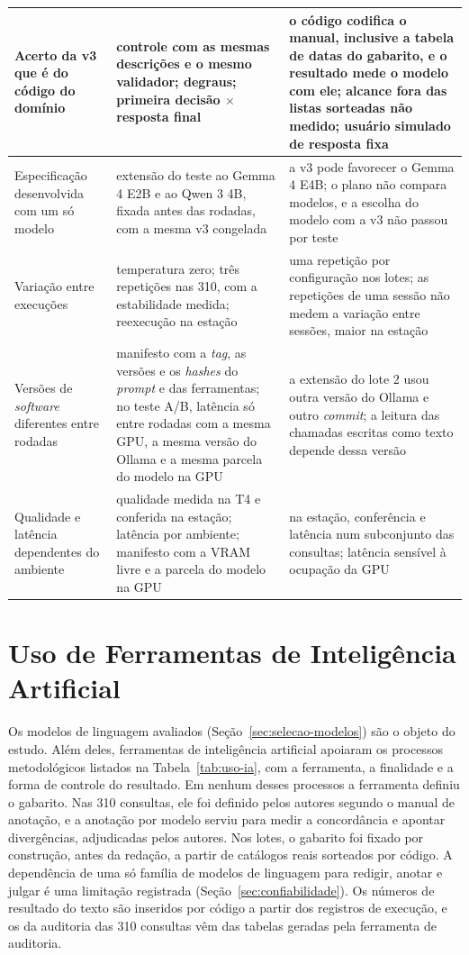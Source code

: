 \begin{table}[htbp!]
\begin{tabular}{|p{3.4cm}|p{5.9cm}|p{5.4cm}|}
Acerto da v3 que é do código do domínio & controle com as mesmas descrições e o mesmo validador; degraus; primeira decisão $\times$ resposta final & o código codifica o manual, inclusive a tabela de datas do gabarito, e o resultado mede o modelo com ele; alcance fora das listas sorteadas não medido; usuário simulado de resposta fixa \\ \hline
Especificação desenvolvida com um só modelo & extensão do teste ao Gemma 4 E2B e ao Qwen 3 4B, fixada antes das rodadas, com a mesma v3 congelada & a v3 pode favorecer o Gemma 4 E4B; o plano não compara modelos, e a escolha do modelo com a v3 não passou por teste \\ \hline
Variação entre execuções & temperatura zero; três repetições nas 310, com a estabilidade medida; reexecução na estação & uma repetição por configuração nos lotes; as repetições de uma sessão não medem a variação entre sessões, maior na estação \\ \hline
Versões de \textit{software} diferentes entre rodadas & manifesto com a \textit{tag}, as versões e os \textit{hashes} do \textit{prompt} e das ferramentas; no teste A/B, latência só entre rodadas com a mesma GPU, a mesma versão do Ollama e a mesma parcela do modelo na GPU & a extensão do lote 2 usou outra versão do Ollama e outro \textit{commit}; a leitura das chamadas escritas como texto depende dessa versão \\ \hline
Qualidade e latência dependentes do ambiente & qualidade medida na T4 e conferida na estação; latência por ambiente; manifesto com a VRAM livre e a parcela do modelo na GPU & na estação, conferência e latência num subconjunto das consultas; latência sensível à ocupação da GPU \\ \hline
\end{tabular}
\end{table}

\section{Uso de Ferramentas de Inteligência Artificial}
\label{sec:uso-ia}

Os modelos de linguagem avaliados (Seção~\ref{sec:selecao-modelos}) são o objeto do estudo. Além deles, ferramentas de inteligência artificial apoiaram os processos metodológicos listados na Tabela~\ref{tab:uso-ia}, com a ferramenta, a finalidade e a forma de controle do resultado. Em nenhum desses processos a ferramenta definiu o gabarito. Nas 310 consultas, ele foi definido pelos autores segundo o manual de anotação, e a anotação por modelo serviu para medir a concordância e apontar divergências, adjudicadas pelos autores. Nos lotes, o gabarito foi fixado por construção, antes da redação, a partir de catálogos reais sorteados por código. A dependência de uma só família de modelos de linguagem para redigir, anotar e julgar é uma limitação registrada (Seção~\ref{sec:confiabilidade}). Os números de resultado do texto são inseridos por código a partir dos registros de execução, e os da auditoria das 310 consultas vêm das tabelas geradas pela ferramenta de auditoria.

